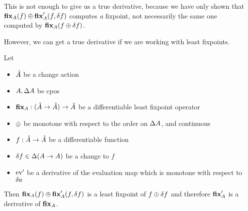 This is not enough to give us a true derivative, because we have only shown 
that $\textbf{fix}_A(f) \oplus \textbf{fix}_A'(f, \delta f)$ computes \emph{a} fixpoint, not necessarily
the same one computed by $\textbf{fix}_A{(f \oplus \delta f)}$.

However, we can get a true derivative if we are working with least fixpoints.

\begin{thm}
\label{thm:leastFixpointDiff}
  Let 
  \begin{itemize}
    \item $\hat{A}$ be a change action 
    \item $A, \Delta A$ be cpos
    \item$\textbf{fix}_A : (\hat{A} \rightarrow \hat{A}) \rightarrow \hat{A}$ be a differentiable
      least fixpoint operator
    \item $\oplus$ be monotone with respect to the order on $\Delta A$, and continuous
    \item $f: \hat{A} \rightarrow \hat{A}$ be a differentiable function
    \item $\delta f \in \Delta (A \rightarrow A)$ be a change to $f$
    \item $\operatorname{ev}'$ be a derivative of the evaluation map which is monotone
      with respect to $\delta a$
  \end{itemize}

  Then $\textbf{fix}_A(f) \oplus \textbf{fix}_A'(f, \delta f)$ is a least
  fixpoint of $f \oplus \delta f$ and therefore $\textbf{fix}_A'$ is a derivative of $\textbf{fix}_A$.
\end{thm}
\ifproofs
